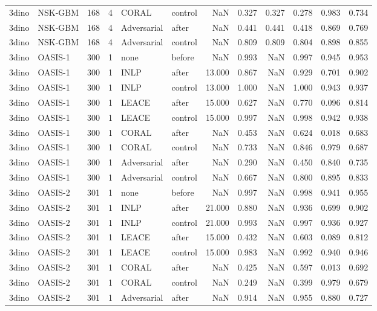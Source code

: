 \begin{tabular}{llrrllrrrrrr}
3dino & NSK-GBM & 168 & 4 & CORAL & control & NaN & 0.327 & 0.327 & 0.278 & 0.983 & 0.734 \\
3dino & NSK-GBM & 168 & 4 & Adversarial & after & NaN & 0.441 & 0.441 & 0.418 & 0.869 & 0.769 \\
3dino & NSK-GBM & 168 & 4 & Adversarial & control & NaN & 0.809 & 0.809 & 0.804 & 0.898 & 0.855 \\
3dino & OASIS-1 & 300 & 1 & none & before & NaN & 0.993 & NaN & 0.997 & 0.945 & 0.953 \\
3dino & OASIS-1 & 300 & 1 & INLP & after & 13.000 & 0.867 & NaN & 0.929 & 0.701 & 0.902 \\
3dino & OASIS-1 & 300 & 1 & INLP & control & 13.000 & 1.000 & NaN & 1.000 & 0.943 & 0.937 \\
3dino & OASIS-1 & 300 & 1 & LEACE & after & 15.000 & 0.627 & NaN & 0.770 & 0.096 & 0.814 \\
3dino & OASIS-1 & 300 & 1 & LEACE & control & 15.000 & 0.997 & NaN & 0.998 & 0.942 & 0.938 \\
3dino & OASIS-1 & 300 & 1 & CORAL & after & NaN & 0.453 & NaN & 0.624 & 0.018 & 0.683 \\
3dino & OASIS-1 & 300 & 1 & CORAL & control & NaN & 0.733 & NaN & 0.846 & 0.979 & 0.687 \\
3dino & OASIS-1 & 300 & 1 & Adversarial & after & NaN & 0.290 & NaN & 0.450 & 0.840 & 0.735 \\
3dino & OASIS-1 & 300 & 1 & Adversarial & control & NaN & 0.667 & NaN & 0.800 & 0.895 & 0.833 \\
3dino & OASIS-2 & 301 & 1 & none & before & NaN & 0.997 & NaN & 0.998 & 0.941 & 0.955 \\
3dino & OASIS-2 & 301 & 1 & INLP & after & 21.000 & 0.880 & NaN & 0.936 & 0.699 & 0.902 \\
3dino & OASIS-2 & 301 & 1 & INLP & control & 21.000 & 0.993 & NaN & 0.997 & 0.936 & 0.927 \\
3dino & OASIS-2 & 301 & 1 & LEACE & after & 15.000 & 0.432 & NaN & 0.603 & 0.089 & 0.812 \\
3dino & OASIS-2 & 301 & 1 & LEACE & control & 15.000 & 0.983 & NaN & 0.992 & 0.940 & 0.946 \\
3dino & OASIS-2 & 301 & 1 & CORAL & after & NaN & 0.425 & NaN & 0.597 & 0.013 & 0.692 \\
3dino & OASIS-2 & 301 & 1 & CORAL & control & NaN & 0.249 & NaN & 0.399 & 0.979 & 0.679 \\
3dino & OASIS-2 & 301 & 1 & Adversarial & after & NaN & 0.914 & NaN & 0.955 & 0.880 & 0.727 \\

\end{tabular}
